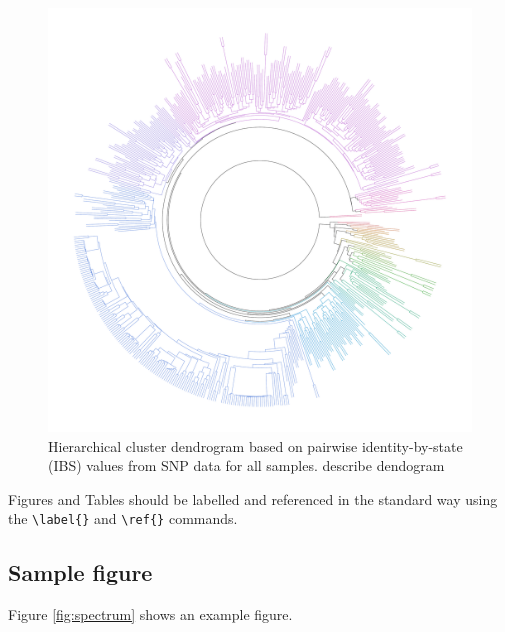 \documentclass[9pt, onecolumn,twoside]{gsajnl}
\begin{document}
\begin{figure}[t]
\centering
\includegraphics[width=\linewidth]{rainbow.pdf}
\caption{Hierarchical cluster dendrogram based on pairwise identity-by-state (IBS) values from SNP data for all samples. describe dendogram}%
\label{fig:pca}
\end{figure}


Figures and Tables should be labelled and referenced in the standard way using the \verb|\label{}| and \verb|\ref{}| commands.

\subsection{Sample figure}

Figure \ref{fig:spectrum} shows an example figure.
\end{document}

